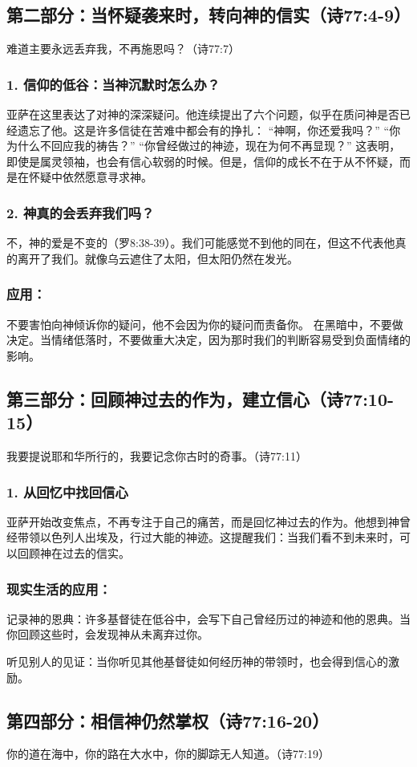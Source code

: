 \documentclass[a4paper, 12pt]{article}
\begin{document}
\subsection*{第二部分：当怀疑袭来时，转向神的信实（诗77:4-9）}
难道主要永远丢弃我，不再施恩吗？（诗77:7）
\subsubsection*{1. 信仰的低谷：当神沉默时怎么办？}
亚萨在这里表达了对神的深深疑问。他连续提出了六个问题，似乎在质问神是否已经遗忘了他。这是许多信徒在苦难中都会有的挣扎：
“神啊，你还爱我吗？”
“你为什么不回应我的祷告？”
“你曾经做过的神迹，现在为何不再显现？”
这表明，即使是属灵领袖，也会有信心软弱的时候。但是，信仰的成长不在于从不怀疑，而是在怀疑中依然愿意寻求神。
\subsubsection*{2. 神真的会丢弃我们吗？}
不，神的爱是不变的（罗8:38-39）。我们可能感觉不到他的同在，但这不代表他真的离开了我们。就像乌云遮住了太阳，但太阳仍然在发光。
\subsubsection*{应用：}
不要害怕向神倾诉你的疑问，他不会因为你的疑问而责备你。
在黑暗中，不要做决定。当情绪低落时，不要做重大决定，因为那时我们的判断容易受到负面情绪的影响。
\subsection*{第三部分：回顾神过去的作为，建立信心（诗77:10-15）}
我要提说耶和华所行的，我要记念你古时的奇事。（诗77:11）
\subsubsection*{1. 从回忆中找回信心}
亚萨开始改变焦点，不再专注于自己的痛苦，而是回忆神过去的作为。他想到神曾经带领以色列人出埃及，行过大能的神迹。这提醒我们：当我们看不到未来时，可以回顾神在过去的信实。
\subsubsection*{现实生活的应用：}
\hspace{0.6cm}记录神的恩典：许多基督徒在低谷中，会写下自己曾经历过的神迹和他的恩典。当你回顾这些时，会发现神从未离弃过你。

听见别人的见证：当你听见其他基督徒如何经历神的带领时，也会得到信心的激励。
\subsection*{第四部分：相信神仍然掌权（诗77:16-20）}
你的道在海中，你的路在大水中，你的脚踪无人知道。（诗77:19）
\end{document}
